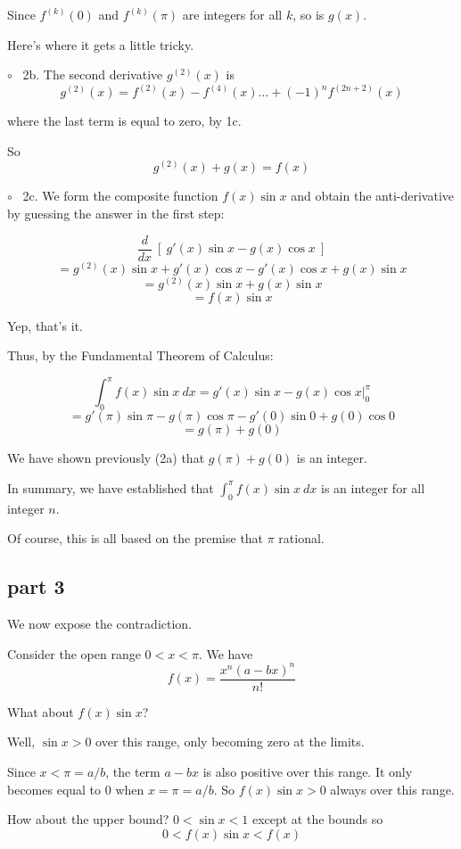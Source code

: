 \documentclass[11pt, oneside]{article}
\begin{document}
Since $f^{(k)} (0)$ and $f^{(k)} (\pi)$ are integers for all $k$, so is $g(x)$.

Here's where it gets a little tricky.  

$\circ$ \ 2b.  The second derivative $g^{(2)}(x)$ is
\[ g^{(2)} (x) = f^{(2)}(x) - f^{(4)}(x) \dots + (-1)^n f^{(2n + 2)}(x) \]

where the last term is equal to zero, by 1c.

So
\[ g^{(2)} (x) + g(x) = f(x) \]

$\circ$ \ 2c.  We form the composite function $f(x) \sin x$ and obtain the anti-derivative by guessing the answer in the first step:

\[ \frac{d}{dx} \ [ \ g'(x) \sin x - g(x) \cos x \ ] \]
\[ = g^{(2)}(x) \sin x + g'(x) \cos x - g'(x) \cos x + g(x) \sin x\]
\[ = g^{(2)}(x) \sin x + g(x) \sin x\]
\[ = f(x) \sin x \]

Yep, that's it.

Thus, by the Fundamental Theorem of Calculus:

\[ \int_0^{\pi} f(x) \sin x \ dx = g'(x) \sin x - g(x) \cos x \bigg |_0^{\pi} \]
\[ = g'(\pi) \sin \pi - g(\pi) \cos \pi - g'(0) \sin 0 + g(0) \cos 0 \]
\[ = g(\pi) + g(0) \]

We have shown previously (2a) that $g(\pi) + g(0)$ is an integer.

In summary, we have established that
$\int_0^{\pi} f(x) \sin x \ dx$ is an integer for all integer $n$.

Of course, this is all based on the premise that $\pi$ rational.

\subsection*{part 3}

We now expose the contradiction.  

Consider the open range $0 < x < \pi$.  We  have
\[ f(x) = \frac{x^n (a-bx)^n}{n!} \]

What about $f(x) \sin x$?  

Well, $\sin x > 0$ over this range, only becoming zero at the limits.  

Since $x < \pi = a/b$, the term $a - bx$ is also positive over this range.  It only becomes equal to $0$ when $x = \pi = a/b$.  So $f(x) \sin x > 0$ always over this range.

How about the upper bound?  $0 < \sin x < 1$ except at the bounds so
\[ 0 < f(x) \sin x < f(x) \]
\end{document}

